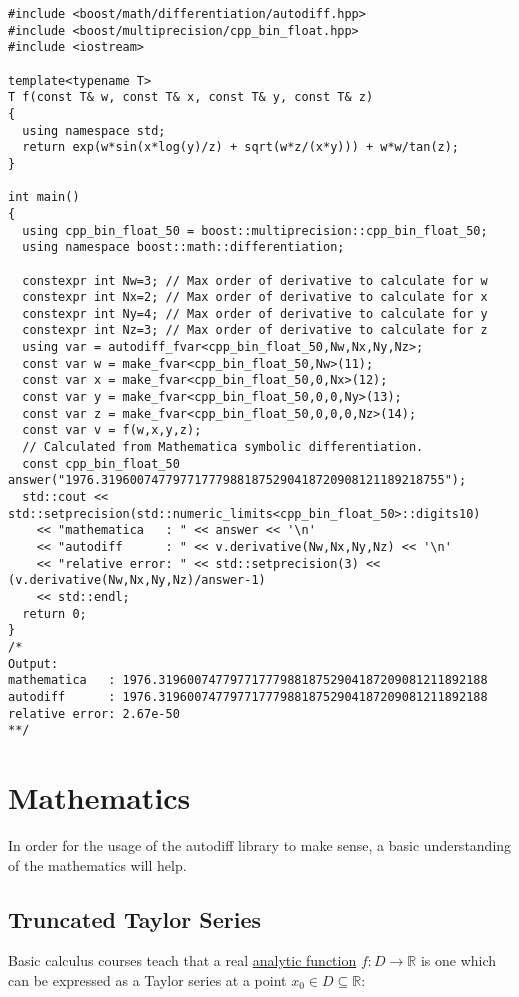 \documentclass{article}
\begin{document}
\begin{verbatim}
#include <boost/math/differentiation/autodiff.hpp>
#include <boost/multiprecision/cpp_bin_float.hpp>
#include <iostream>

template<typename T>
T f(const T& w, const T& x, const T& y, const T& z)
{
  using namespace std;
  return exp(w*sin(x*log(y)/z) + sqrt(w*z/(x*y))) + w*w/tan(z);
}

int main()
{
  using cpp_bin_float_50 = boost::multiprecision::cpp_bin_float_50;
  using namespace boost::math::differentiation;

  constexpr int Nw=3; // Max order of derivative to calculate for w
  constexpr int Nx=2; // Max order of derivative to calculate for x
  constexpr int Ny=4; // Max order of derivative to calculate for y
  constexpr int Nz=3; // Max order of derivative to calculate for z
  using var = autodiff_fvar<cpp_bin_float_50,Nw,Nx,Ny,Nz>;
  const var w = make_fvar<cpp_bin_float_50,Nw>(11);
  const var x = make_fvar<cpp_bin_float_50,0,Nx>(12);
  const var y = make_fvar<cpp_bin_float_50,0,0,Ny>(13);
  const var z = make_fvar<cpp_bin_float_50,0,0,0,Nz>(14);
  const var v = f(w,x,y,z);
  // Calculated from Mathematica symbolic differentiation.
  const cpp_bin_float_50 answer("1976.319600747797717779881875290418720908121189218755");
  std::cout << std::setprecision(std::numeric_limits<cpp_bin_float_50>::digits10)
    << "mathematica   : " << answer << '\n'
    << "autodiff      : " << v.derivative(Nw,Nx,Ny,Nz) << '\n'
    << "relative error: " << std::setprecision(3) << (v.derivative(Nw,Nx,Ny,Nz)/answer-1)
    << std::endl;
  return 0;
}
/*
Output:
mathematica   : 1976.3196007477977177798818752904187209081211892188
autodiff      : 1976.3196007477977177798818752904187209081211892188
relative error: 2.67e-50
**/
\end{verbatim}

\section{Mathematics}

In order for the usage of the autodiff library to make sense, a basic understanding of the mathematics will help.

\subsection{Truncated Taylor Series}

Basic calculus courses teach that a real \href{https://en.wikipedia.org/wiki/Analytic_function}{analytic function}
$f : D\rightarrow\mathbb{R}$ is one which can be expressed as a Taylor series at a point
$x_0\in D\subseteq\mathbb{R}$:
\end{document}
